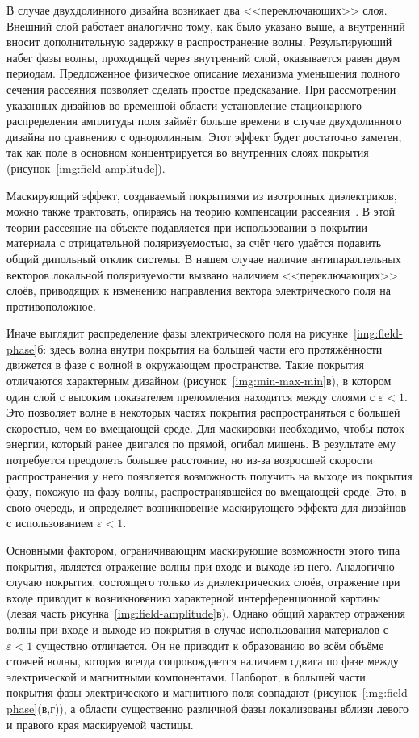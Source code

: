 В случае двухдолинного дизайна возникает два <<переключающих>> слоя.
Внешний слой работает аналогично тому, как было указано выше, а
внутренний вносит дополнительную задержку в распространение
волны. Результирующий набег фазы волны, проходящей через внутренний
слой, оказывается равен двум периодам.  Предложенное физическое
описание механизма уменьшения полного сечения рассеяния позволяет
сделать простое предсказание.  При рассмотрении указанных дизайнов во
временной области установление стационарного распределения амплитуды
поля займёт больше времени в случае
двухдолинного дизайна по сравнению с однодолинным. Этот эффект будет
достаточно заметен, так как поле в основном концентрируется во
внутренних слоях покрытия (рисунок~\ref{img:field-amplitude}).

Маскирующий эффект, создаваемый покрытиями из изотропных диэлектриков,
можно также трактовать, опираясь на теорию компенсации
рассеяния~\cite{Alu-2005, alu}.  В этой теории рассеяние на объекте
подавляется при использовании в покрытии материала с отрицательной
поляризуемостью, за счёт чего удаётся подавить общий дипольный отклик
системы. В нашем случае наличие антипараллельных векторов локальной
поляризуемости вызвано наличием <<переключающих>> слоёв, приводящих к
изменению направления вектора электрического поля на противоположное.

Иначе выглядит распределение фазы электрического поля на
рисунке~\ref{img:field-phase}б: здесь волна внутри покрытия на
большей части его протяжённости движется в фазе с волной в окружающем
пространстве.  Такие покрытия отличаются характерным дизайном
(рисунок~\ref{img:min-max-min}в), в котором один слой с высоким
показателем преломления находится между слоями с
${\varepsilon<1}$. Это позволяет волне в некоторых частях покрытия распространяться
с большей скоростью, чем во вмещающей среде. Для маскировки
необходимо, чтобы поток энергии, который ранее двигался по прямой,
огибал мишень. В результате ему потребуется преодолеть большее
расстояние, но из-за возросшей скорости распространения у него
появляется возможность получить на выходе из покрытия фазу, похожую на
фазу волны, распространявшейся во вмещающей среде. Это, в свою
очередь, и определяет возникновение маскирующего эффекта для дизайнов
с использованием ${\varepsilon<1}$.

Основными фактором, ограничивающим маскирующие возможности этого типа
покрытия, является отражение волны при входе и выходе из него.
Аналогично случаю покрытия, состоящего только из диэлектрических
слоёв, отражение при входе приводит к возникновению характерной
интерференционной картины (левая часть
рисунка~\ref{img:field-amplitude}в). Однако общий характер отражения
волны при входе и выходе из покрытия в случае использования материалов
с ${\varepsilon<1}$ существно отличается. Он не приводит к образованию
во всём объёме стоячей волны, которая всегда сопровождается наличием
сдвига по фазе между электрической и магнитными
компонентами. Наоборот, в большей части покрытия фазы электрического и
магнитного поля совпадают (рисунок~\ref{img:field-phase}(в,г)), а
области существенно различной фазы локализованы вблизи левого и
правого края маскируемой частицы.

